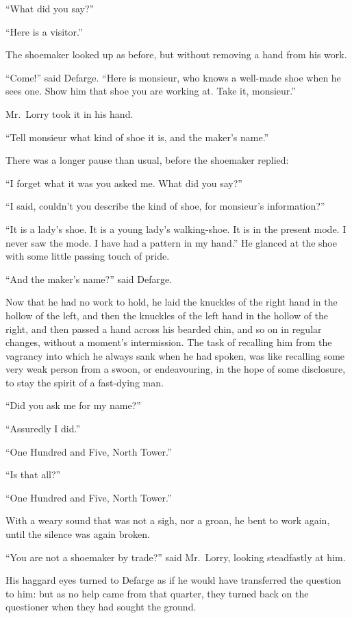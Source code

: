 ``What did you say?''

``Here is a visitor.''

The shoemaker looked up as before, but without removing a hand from his work.

``Come!'' said Defarge.  ``Here is monsieur, who knows a well-made shoe
when he sees one.  Show him that shoe you are working at.  Take it, monsieur.''

Mr.\ Lorry took it in his hand.

``Tell monsieur what kind of shoe it is, and the maker's name.''

There was a longer pause than usual, before the shoemaker replied:

``I forget what it was you asked me.  What did you say?''

``I said, couldn't you describe the kind of shoe, for monsieur's information?''

``It is a lady's shoe.  It is a young lady's walking-shoe.  It is in the
present mode.  I never saw the mode.  I have had a pattern in my hand.''
He glanced at the shoe with some little passing touch of pride.

``And the maker's name?'' said Defarge.

Now that he had no work to hold, he laid the knuckles of the right hand
in the hollow of the left, and then the knuckles of the left hand in the
hollow of the right, and then passed a hand across his bearded chin,
and so on in regular changes, without a moment's intermission.
The task of recalling him from the vagrancy into which he always
sank when he had spoken, was like recalling some very weak person
from a swoon, or endeavouring, in the hope of some disclosure,
to stay the spirit of a fast-dying man.

``Did you ask me for my name?''

``Assuredly I did.''

``One Hundred and Five, North Tower.''

``Is that all?''

``One Hundred and Five, North Tower.''

With a weary sound that was not a sigh, nor a groan, he bent to work
again, until the silence was again broken.

``You are not a shoemaker by trade?'' said Mr.\ Lorry, looking steadfastly
at him.

His haggard eyes turned to Defarge as if he would have transferred
the question to him:  but as no help came from that quarter, they
turned back on the questioner when they had sought the ground.

